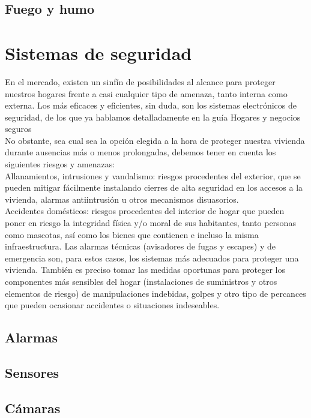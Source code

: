 \subsection{Fuego y humo}

\section{Sistemas de seguridad}
En el mercado, existen un sinfín de posibilidades al alcance para proteger nuestros hogares frente a casi cualquier tipo de amenaza, tanto interna como externa. Los más eficaces y eficientes, sin duda, son los sistemas electrónicos de seguridad, de los que ya hablamos detalladamente en la guía Hogares y negocios seguros\\

No obstante, sea cual sea la opción elegida a la hora de proteger nuestra vivienda durante ausencias más o menos prolongadas, debemos tener en cuenta los siguientes riesgos y amenazas:\\

Allanamientos, intrusiones y vandalismo: riesgos procedentes del exterior, que se pueden mitigar fácilmente instalando cierres de alta seguridad en los accesos a la vivienda, alarmas antiintrusión u otros mecanismos disuasorios.\\

Accidentes domésticos: riesgos procedentes del interior de hogar que pueden poner en riesgo la integridad física y/o moral de sus habitantes, tanto personas como mascotas, así como los bienes que contienen e incluso la misma infraestructura. Las alarmas técnicas (avisadores de fugas y escapes) y de emergencia son, para estos casos, los sistemas más adecuados para proteger una vivienda. También es preciso tomar las medidas oportunas para proteger los componentes más sensibles del hogar (instalaciones de suministros y otros elementos de riesgo) de manipulaciones indebidas, golpes y otro tipo de percances que pueden ocasionar accidentes o situaciones indeseables.

\subsection{Alarmas}
\subsection{Sensores}
\subsection{Cámaras}
